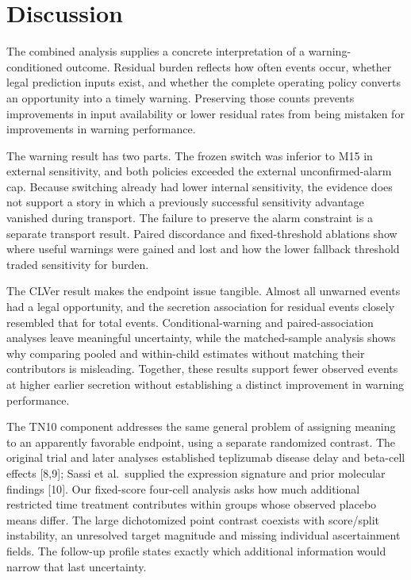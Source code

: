 \documentclass[
  american,
  11pt,
  letterpaper,
]{article}
\begin{document}
\section{Discussion}\label{discussion}

The combined analysis supplies a concrete interpretation of a
warning-conditioned outcome. Residual burden reflects how often events
occur, whether legal prediction inputs exist, and whether the complete
operating policy converts an opportunity into a timely warning.
Preserving those counts prevents improvements in input availability or
lower residual rates from being mistaken for improvements in warning
performance.

The warning result has two parts. The frozen switch was inferior to M15
in external sensitivity, and both policies exceeded the external
unconfirmed-alarm cap. Because switching already had lower internal
sensitivity, the evidence does not support a story in which a previously
successful sensitivity advantage vanished during transport. The failure
to preserve the alarm constraint is a separate transport result. Paired
discordance and fixed-threshold ablations show where useful warnings
were gained and lost and how the lower fallback threshold traded
sensitivity for burden.

The CLVer result makes the endpoint issue tangible. Almost all unwarned
events had a legal opportunity, and the secretion association for
residual events closely resembled that for total events.
Conditional-warning and paired-association analyses leave meaningful
uncertainty, while the matched-sample analysis shows why comparing
pooled and within-child estimates without matching their contributors is
misleading. Together, these results support fewer observed events at
higher earlier secretion without establishing a distinct improvement in
warning performance.

The TN10 component addresses the same general problem of assigning
meaning to an apparently favorable endpoint, using a separate randomized
contrast. The original trial and later analyses established teplizumab
disease delay and beta-cell effects {[}8,9{]}; Sassi et al.~supplied the
expression signature and prior molecular findings {[}10{]}. Our
fixed-score four-cell analysis asks how much additional restricted time
treatment contributes within groups whose observed placebo means differ.
The large dichotomized point contrast coexists with score/split
instability, an unresolved target magnitude and missing individual
ascertainment fields. The follow-up profile states exactly which
additional information would narrow that last uncertainty.
\end{document}
